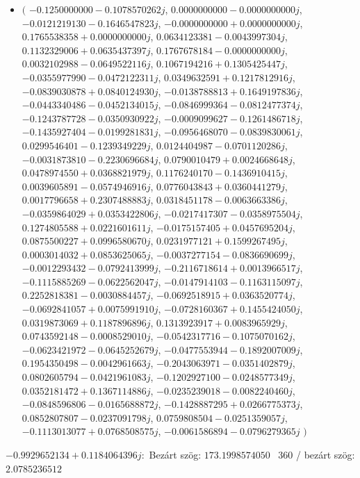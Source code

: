 \documentclass[14pt,a4paper]{article}
\begin{document}
\begin{itemize}
\item
$\big($
$-0.1250000000-0.1078570262j$, $0.0000000000-0.0000000000j$, $-0.0121219130-0.1646547823j$, $-0.0000000000+0.0000000000j$, $0.1765538358+0.0000000000j$, $0.0634123381-0.0043997304j$, $0.1132329006+0.0635437397j$, $0.1767678184-0.0000000000j$, $0.0032102988-0.0649522116j$, $0.1067194216+0.1305425447j$, $-0.0355977990-0.0472122311j$, $0.0349632591+0.1217812916j$, $-0.0839030878+0.0840124930j$, $-0.0138788813+0.1649197836j$, $-0.0443340486-0.0452134015j$, $-0.0846999364-0.0812477374j$, $-0.1243787728-0.0350930922j$, $-0.0009099627-0.1261486718j$, $-0.1435927404-0.0199281831j$, $-0.0956468070-0.0839830061j$, $0.0299546401-0.1239349229j$, $0.0124404987-0.0701120286j$, $-0.0031873810-0.2230696684j$, $0.0790010479+0.0024668648j$, $0.0478974550+0.0368821979j$, $0.1176240170-0.1436910415j$, $0.0039605891-0.0574946916j$, $0.0776043843+0.0360441279j$, $0.0017796658+0.2307488883j$, $0.0318451178-0.0063663386j$, $-0.0359864029+0.0353422806j$, $-0.0217417307-0.0358975504j$, $0.1274805588+0.0221601611j$, $-0.0175157405+0.0457695204j$, $0.0875500227+0.0996580670j$, $0.0231977121+0.1599267495j$, $0.0003014032+0.0853625065j$, $-0.0037277154-0.0836690699j$, $-0.0012293432-0.0792413999j$, $-0.2116718614+0.0013966517j$, $-0.1115885269-0.0622562047j$, $-0.0147914103-0.1163115097j$, $0.2252818381-0.0030884457j$, $-0.0692518915+0.0363520774j$, $-0.0692841057+0.0075991910j$, $-0.0728160367+0.1455424050j$, $0.0319873069+0.1187896896j$, $0.1313923917+0.0083965929j$, $0.0743592148-0.0008529010j$, $-0.0542317716-0.1075070162j$, $-0.0623421972-0.0645252679j$, $-0.0477553944-0.1892007009j$, $0.1954350498-0.0042961663j$, $-0.2043063971-0.0351402879j$, $0.0802605794-0.0421961083j$, $-0.1202927100-0.0248577349j$, $0.0352181472+0.1367114886j$, $-0.0235239018-0.0082240460j$, $-0.0848596806-0.0165688872j$, $-0.1428887295+0.0266775373j$, $0.0852807807-0.0237091798j$, $0.0759808504-0.0251359057j$, $-0.1113013077+0.0768508575j$, $-0.0061586894-0.0796279365j$
$\big)$
\end{itemize}
$-0.9929652134+0.1184064396j$:\
Bezárt szög: $173.1998574050$ \
360 / bezárt szög: $2.0785236512$\
\end{document}
